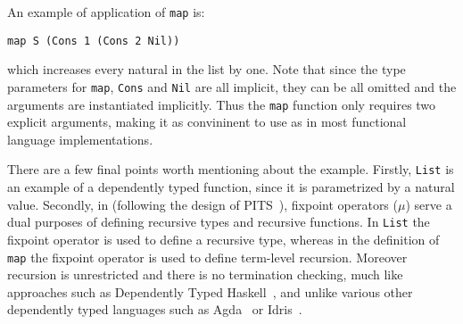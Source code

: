 An example of application of \verb|map| is:

\begin{verbatim}
map S (Cons 1 (Cons 2 Nil))
\end{verbatim}

\noindent which increases every natural in the list by one. 
Note that since the type parameters for \verb|map|, \verb|Cons| and \verb|Nil|
are all implicit, they can be all omitted
and the arguments are instantiated implicitly. Thus the \verb|map| function
only requires two explicit arguments, making it as convininent to use
as in most functional language implementations. 


There are a few final points worth mentioning about the example.
Firstly, \verb|List| is an example of a dependently typed function, since it is parametrized
by a natural value. Secondly, in \name (following the design of PITS~\cite{}),
fixpoint operators ($\mu$) serve a dual purposes of defining recursive types and recursive
functions. In \verb|List| the fixpoint operator is used to define a recursive type, whereas
in the definition of \verb|map| the fixpoint operator is used to define term-level recursion.
Moreover recursion is unrestricted and there is no termination checking, much like approaches
such as Dependently Typed Haskell~\cite{}, and unlike various other dependently typed languages
such as Agda~\cite{} or Idris~\cite{}.


